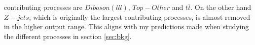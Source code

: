 contributing processes are $Diboson(lll)$, $Top-Other$ and $t\bar{t}$. On the other hand $Z-jets$, which is originally the 
largest contributing processes, is almost removed in the higher output range. This aligns with my predictions made when studying the 
different processes in section \ref{sec:bkg}. 
\begin{figure}
\end{figure}
